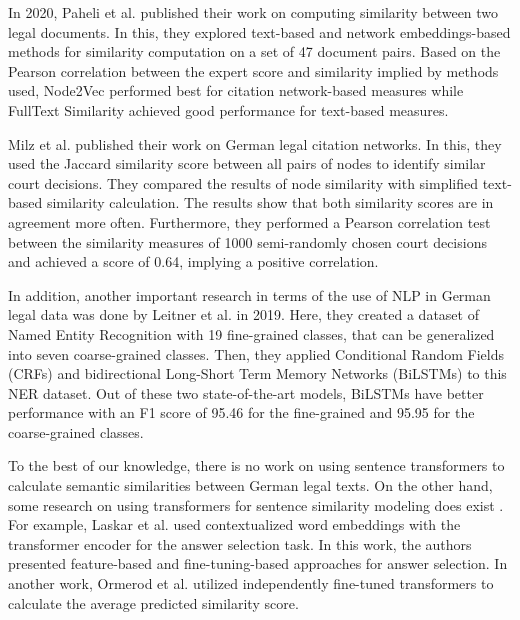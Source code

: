 \documentclass[runningheads]{llncs}
\begin{document}
In 2020, Paheli et al.\cite{bhattacharya2020methods} published their work on computing similarity between two legal documents. In this, they explored text-based and network embeddings-based methods for similarity computation on a set of 47 document pairs. Based on the Pearson correlation between the expert score and similarity implied by methods used, Node2Vec performed best for citation network-based measures while FullText Similarity achieved good performance for text-based measures.

Milz et al. published their work on German legal citation networks\cite{milz2021analysis}. In this, they used the Jaccard similarity score between all pairs of nodes to identify similar court decisions. They compared the results of node similarity with simplified text-based similarity calculation. The results show that both similarity scores are in agreement more often. Furthermore, they performed a Pearson correlation test between the similarity measures of 1000 semi-randomly chosen court decisions and achieved a score of 0.64, implying a positive correlation.

In addition, another important research in terms of the use of NLP in German legal data was done by Leitner et al.\cite{leitner2019fine} in 2019. Here, they created a dataset of Named Entity Recognition with 19 fine-grained classes, that can be generalized into seven coarse-grained classes. Then, they applied Conditional Random Fields (CRFs) and bidirectional Long-Short Term Memory Networks (BiLSTMs) to this NER dataset. Out of these two state-of-the-art models, BiLSTMs have better performance with an F1 score of 95.46 for the fine-grained and 95.95 for the coarse-grained classes.

To the best of our knowledge, there is no work on using sentence transformers to calculate semantic similarities between German legal texts. On the other hand, some research on using transformers for sentence similarity modeling does exist . For example, Laskar et al.\cite{laskar2020contextualized} used contextualized word embeddings with the transformer encoder for the answer selection task. In this work, the authors presented feature-based and fine-tuning-based approaches for answer selection. In another work, Ormerod et al.\cite{ormerod2021predicting} utilized independently fine-tuned transformers to calculate the average predicted similarity score.

\end{document}
